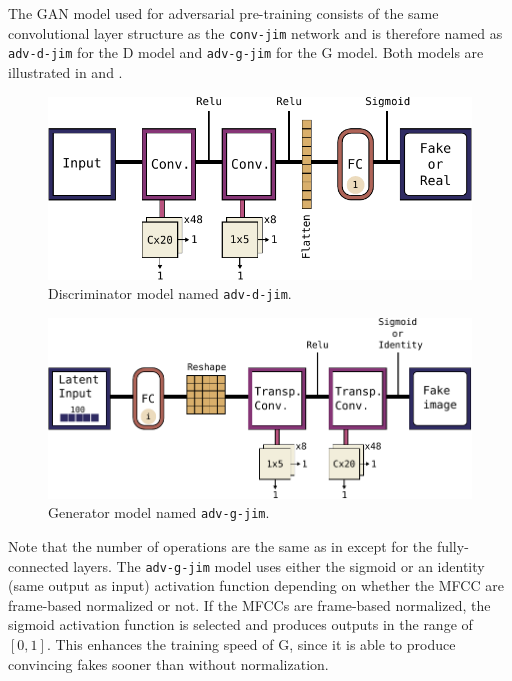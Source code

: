 The GAN model used for adversarial pre-training consists of the same convolutional layer structure as the \texttt{conv-jim} network and is therefore named as \texttt{adv-d-jim} for the D model and \texttt{adv-g-jim} for the G model.
Both models are illustrated in  and .
\begin{figure}[!ht]
  \centering
    \includegraphics[height=0.23\textwidth]{./4_nn/figs/nn_arch_adv_d_jim.pdf}
  \caption{Discriminator model named \texttt{adv-d-jim}.}
  \label{fig:nn_arch_adv_d_jim}
\end{figure}
\FloatBarrier
\noindent
\begin{figure}[!ht]
  \centering
    \includegraphics[height=0.26\textwidth]{./4_nn/figs/nn_arch_adv_g_jim.pdf}
  \caption{Generator model named \texttt{adv-g-jim}.}
  \label{fig:nn_arch_adv_g_jim}
\end{figure}
\FloatBarrier
\noindent
Note that the number of operations are the same as in  except for the fully-connected layers.
The \texttt{adv-g-jim} model uses either the sigmoid or an identity (same output as input) activation function depending on whether the MFCC are frame-based normalized or not.
If the MFCCs are frame-based normalized, the sigmoid activation function is selected and produces outputs in the range of $[0, 1]$.
This enhances the training speed of G, since it is able to produce convincing fakes sooner than without normalization.



